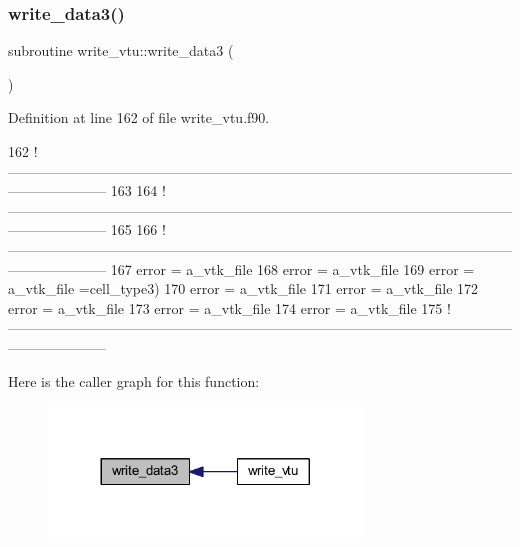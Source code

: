 \subsubsection{\texorpdfstring{write\+\_\+data3()}{write\_data3()}}
{\footnotesize\ttfamily subroutine write\+\_\+vtu\+::write\+\_\+data3 (\begin{DoxyParamCaption}{ }\end{DoxyParamCaption})}



Definition at line 162 of file write\+\_\+vtu.\+f90.


\begin{DoxyCode}
162   \textcolor{comment}{
      !---------------------------------------------------------------------------------------------------------------------------------}
163   
164   \textcolor{comment}{
      !---------------------------------------------------------------------------------------------------------------------------------}
165 
166   \textcolor{comment}{
      !---------------------------------------------------------------------------------------------------------------------------------}
167   error = a\_vtk\_file%
168   error = a\_vtk\_file%
169   error = a\_vtk\_file%
      =cell\_type3)
170   error = a\_vtk\_file%
171   error = a\_vtk\_file%
172   error = a\_vtk\_file%
173   error = a\_vtk\_file%
174   error = a\_vtk\_file%
175   \textcolor{comment}{
      !---------------------------------------------------------------------------------------------------------------------------------}
\end{DoxyCode}
Here is the caller graph for this function\+:\nopagebreak
\begin{figure}[H]
\begin{center}
\leavevmode
\includegraphics[width=236pt]{write__vtu_8f90_ab859d2be74950aa978bc251eddf0b307_icgraph}
\end{center}
\end{figure}
\mbox{\label{write__vtu_8f90_a2a0b4e97269ec439c6dd440509f9742c}} 
